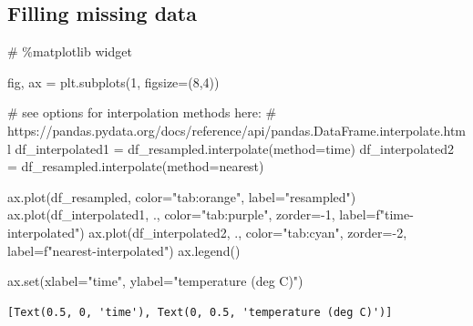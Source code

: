 \documentclass[
  letterpaper,
  DIV=11,
  numbers=noendperiod,
  oneside]{scrreprt}
\newenvironment{Shaded}{\begin{snugshade}}{\end{snugshade}}
\newcommand{\BuiltInTok}[1]{\textcolor[rgb]{0.00,0.23,0.31}{#1}}
\newcommand{\CommentTok}[1]{\textcolor[rgb]{0.37,0.37,0.37}{#1}}
\newcommand{\DecValTok}[1]{\textcolor[rgb]{0.68,0.00,0.00}{#1}}
\newcommand{\NormalTok}[1]{\textcolor[rgb]{0.00,0.23,0.31}{#1}}
\newcommand{\OperatorTok}[1]{\textcolor[rgb]{0.37,0.37,0.37}{#1}}
\newcommand{\SpecialStringTok}[1]{\textcolor[rgb]{0.13,0.47,0.30}{#1}}
\newcommand{\StringTok}[1]{\textcolor[rgb]{0.13,0.47,0.30}{#1}}
\begin{document}
\hypertarget{filling-missing-data}{%
\subsection{Filling missing data}\label{filling-missing-data}}

\begin{Shaded}
\begin{Highlighting}[]
\CommentTok{\# \%matplotlib widget}

\NormalTok{fig, ax }\OperatorTok{=}\NormalTok{ plt.subplots(}\DecValTok{1}\NormalTok{, figsize}\OperatorTok{=}\NormalTok{(}\DecValTok{8}\NormalTok{,}\DecValTok{4}\NormalTok{))}

\CommentTok{\# see options for interpolation methods here:}
\CommentTok{\# https://pandas.pydata.org/docs/reference/api/pandas.DataFrame.interpolate.html}
\NormalTok{df\_interpolated1 }\OperatorTok{=}\NormalTok{ df\_resampled.interpolate(method}\OperatorTok{=}\StringTok{\textquotesingle{}time\textquotesingle{}}\NormalTok{)}
\NormalTok{df\_interpolated2 }\OperatorTok{=}\NormalTok{ df\_resampled.interpolate(method}\OperatorTok{=}\StringTok{\textquotesingle{}nearest\textquotesingle{}}\NormalTok{)}

\NormalTok{ax.plot(df\_resampled, color}\OperatorTok{=}\StringTok{"tab:orange"}\NormalTok{, label}\OperatorTok{=}\StringTok{"resampled"}\NormalTok{)}
\NormalTok{ax.plot(df\_interpolated1, }\StringTok{\textquotesingle{}.\textquotesingle{}}\NormalTok{, color}\OperatorTok{=}\StringTok{"tab:purple"}\NormalTok{, zorder}\OperatorTok{={-}}\DecValTok{1}\NormalTok{,}
\NormalTok{        label}\OperatorTok{=}\SpecialStringTok{f"time{-}interpolated"}\NormalTok{)}
\NormalTok{ax.plot(df\_interpolated2, }\StringTok{\textquotesingle{}.\textquotesingle{}}\NormalTok{, color}\OperatorTok{=}\StringTok{"tab:cyan"}\NormalTok{, zorder}\OperatorTok{={-}}\DecValTok{2}\NormalTok{,}
\NormalTok{        label}\OperatorTok{=}\SpecialStringTok{f"nearest{-}interpolated"}\NormalTok{)}
\NormalTok{ax.legend()}

\NormalTok{ax.}\BuiltInTok{set}\NormalTok{(xlabel}\OperatorTok{=}\StringTok{"time"}\NormalTok{,}
\NormalTok{       ylabel}\OperatorTok{=}\StringTok{"temperature (deg C)"}\NormalTok{)}
\end{Highlighting}
\end{Shaded}

\begin{verbatim}
[Text(0.5, 0, 'time'), Text(0, 0.5, 'temperature (deg C)')]
\end{verbatim}
\end{document}
